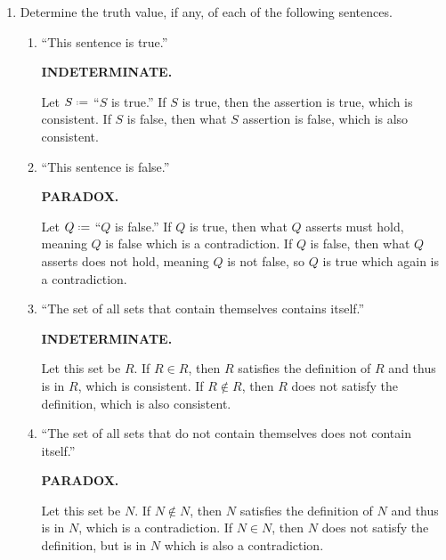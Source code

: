 \documentclass[12pt]{article}
\newcommand{\defeq}{\mathrel{\vcenter{\baselineskip0.5ex \lineskiplimit0pt \hbox{\scriptsize.}\hbox{\scriptsize.}}}=}
\begin{document}
\begin{enumerate}[left=0pt, itemsep=2em, parsep=1em]
\begin{enumerate}[label=(\alph*), itemsep=1.5em, leftmargin=2em]
      \item
        ``No natural number is boring.''
        
        \textbf{FALSE.}
        
        From part (e), there has to exist some boring natural numbers so that non-boring' natural numbers exist.
    \end{enumerate}

  \item
    Determine the truth value, if any, of each of the following sentences.
    
    \begin{enumerate}[label=(\alph*), itemsep=1.5em, leftmargin=2em]
      \item
        ``This sentence is true.''
        
        \textbf{INDETERMINATE.}
        
        Let $S \defeq$ ``$S$ is true.'' 
        If $S$ is true, then the assertion is true, which is consistent.
        If $S$ is false, then what $S$ assertion is false, which is also consistent.
        
      \item
        ``This sentence is false.''
        
        \textbf{PARADOX.}
        
        Let $Q \defeq$ ``$Q$ is false.'' If $Q$ is true, then what $Q$ asserts must hold, meaning $Q$ is false which is a contradiction.
        If $Q$ is false, then what $Q$ asserts does not hold, meaning $Q$ is not false, so $Q$ is true which again is a contradiction.
        
      \item
        ``The set of all sets that contain themselves contains itself.''
        
        \textbf{INDETERMINATE.}
        

        Let this set be $R$. If $R \in R$, then $R$ satisfies the definition of $R$ and thus is in $R$, which is consistent.
        If $R \notin R$, then $R$ does not satisfy the definition, which is also consistent.
        
      \item
        ``The set of all sets that do not contain themselves does not contain itself.''
        
        \textbf{PARADOX.}
        
        Let this set be $N$. If $N \notin N$, then $N$ satisfies the definition of $N$ and thus is in $N$, which is a contradiction.
        If $N \in N$, then $N$ does not satisfy the definition, but is in $N$ which is also a contradiction.


\end{enumerate}
\end{enumerate}
\end{document}
